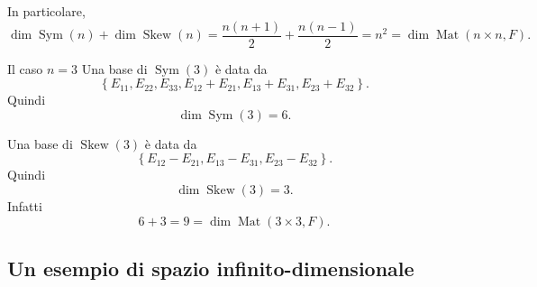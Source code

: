 \documentclass[a4paper]{article}
\begin{document}
\begin{center}
\end{center}

In particolare,
\[
    \dim\operatorname{Sym}(n)+\dim\operatorname{Skew}(n)
    =
    \frac{n(n+1)}{2}+\frac{n(n-1)}{2}
    =
    n^2
    =
    \dim\operatorname{Mat}(n\times n,F).
\]

\begin{snippetexample}{Il caso \(n=3\)}
    Una base di \(\operatorname{Sym}(3)\) è data da
    \[
        \left\{
            E_{11},E_{22},E_{33},
            E_{12}+E_{21},
            E_{13}+E_{31},
            E_{23}+E_{32}
        \right\}.
    \]
    Quindi
    \[
        \dim\operatorname{Sym}(3)=6.
    \]

    Una base di \(\operatorname{Skew}(3)\) è data da
    \[
        \left\{
            E_{12}-E_{21},
            E_{13}-E_{31},
            E_{23}-E_{32}
        \right\}.
    \]
    Quindi
    \[
        \dim\operatorname{Skew}(3)=3.
    \]
    Infatti
    \[
        6+3=9=\dim\operatorname{Mat}(3\times 3,F).
    \]
\end{snippetexample}

\subsection{Un esempio di spazio infinito-dimensionale}
\end{document}
